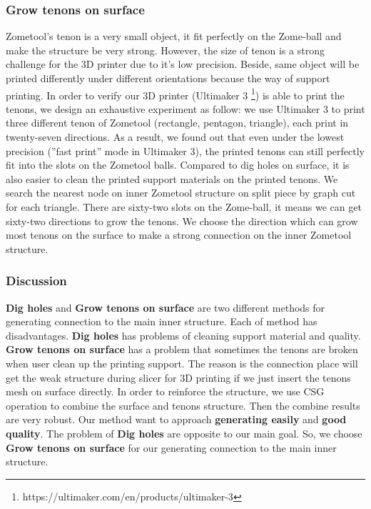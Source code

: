 \subsubsection{Grow tenons on surface}
Zometool's tenon is a very small object, it fit perfectly on the Zome-ball and make the structure be very strong. 
However, the size of tenon is a strong challenge for the 3{D} printer due to it's low precision. 
Beside, same object will be printed differently under different orientations because the way of support printing.
In order to verify our 3{D} printer (Ultimaker 3 \footnote{https://ultimaker.com/en/products/ultimaker-3}) is able to print the tenons, we design an exhaustive experiment as follow:
we use Ultimaker 3 to print three different tenon of Zometool (rectangle, pentagon, triangle), each print in twenty-seven directions. 
As a result, we found out that even under the lowest precision (''fast print'' mode in Ultimaker 3), the printed tenons can still perfectly fit into the slots on the Zometool balls.
Compared to dig holes on surface, it is also easier to clean the printed support materials on the printed tenons.
We search the nearest node on inner Zometool structure on split piece by graph cut for each triangle. There are sixty-two slots on the Zome-ball, it means we can get sixty-two directions to grow the tenons. 
We choose the direction which can grow most tenons on the surface to make a strong connection on the inner Zometool structure.

\subsubsection{Discussion}
\textbf{Dig holes} and \textbf{Grow tenons on surface} are two different methods for generating connection to the main inner structure. Each of method has disadvantages. \textbf{Dig holes} has problems of cleaning support material and quality. \textbf{Grow tenons on surface} has a problem that sometimes the tenons are broken when user clean up the printing support. The reason is the connection place will get the weak structure during slicer for 3D printing if we just insert the tenons mesh on surface directly. In order to reinforce the structure, we use CSG operation to combine the surface and tenons structure. Then the combine results are very robust. Our method want to approach \textbf{generating easily} and \textbf{good quality}. The problem of \textbf{Dig holes} are opposite to our main goal. So, we choose \textbf{Grow tenons on surface} for our generating connection to the main inner structure. 
    
